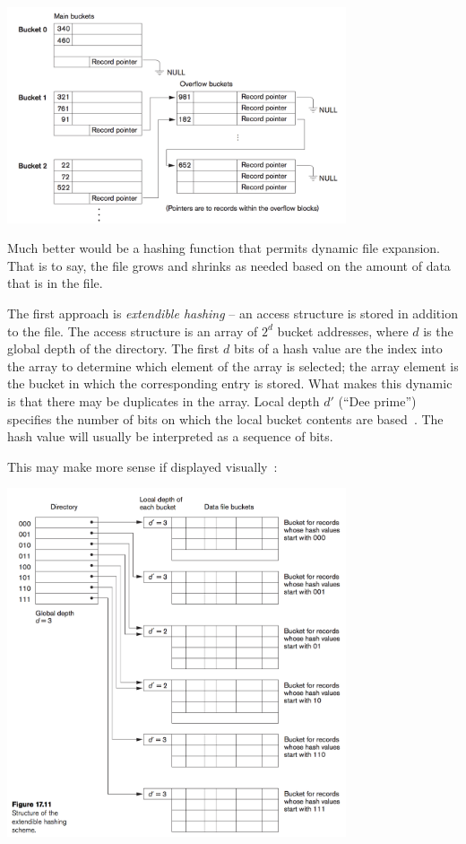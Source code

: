 \begin{center}
	\includegraphics[width=0.75\textwidth]{images/overflow-buckets}
\end{center}

Much better would be a hashing function that permits dynamic file expansion. That is to say, the file grows and shrinks as needed based on the amount of data that is in the file.

The first approach is \textit{extendible hashing} -- an access structure is stored in addition to the file. The access structure is an array of $2^{d}$ bucket addresses, where $d$ is the global depth of the directory. The first $d$ bits of a hash value are the index into the array to determine which element of the array is selected; the array element is the bucket in which the corresponding entry is stored. What makes this dynamic is that there may be duplicates in the array. Local depth $d'$ (``Dee prime'') specifies the number of bits on which the local bucket contents are based~\cite{fds}. The hash value will usually be interpreted as a sequence of bits.

This may make more sense if displayed visually~\cite{fds}:

\begin{center}
	\includegraphics[width=0.75\textwidth]{images/extendible-hashing}
\end{center}

